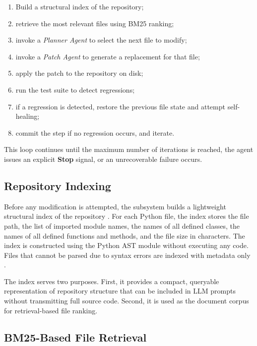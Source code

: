 \begin{enumerate}[nosep]
    \item Build a structural index of the repository;
    \item retrieve the most relevant files using BM25 ranking;
    \item invoke a \textit{Planner Agent} to select the next file to modify;
    \item invoke a \textit{Patch Agent} to generate a replacement for that file;
    \item apply the patch to the repository on disk;
    \item run the test suite to detect regressions;
    \item if a regression is detected, restore the previous file state and attempt self-healing;
    \item commit the step if no regression occurs, and iterate.
\end{enumerate}

This loop continues until the maximum number of iterations is reached, the agent issues an explicit \textbf{Stop} signal, or an unrecoverable failure occurs.

\subsection{Repository Indexing}
\label{subsec:impl_indexing}

Before any modification is attempted, the subsystem builds a lightweight structural index of the repository \cite{zhang2023repocoder}. For each Python file, the index stores the file path, the list of imported module names, the names of all defined classes, the names of all defined functions and methods, and the file size in characters. The index is constructed using the Python AST module without executing any code. Files that cannot be parsed due to syntax errors are indexed with metadata only \cite{zhang2023repocoder}.

The index serves two purposes. First, it provides a compact, queryable representation of repository structure that can be included in LLM prompts without transmitting full source code. Second, it is used as the document corpus for retrieval-based file ranking.

\subsection{BM25-Based File Retrieval}
\label{subsec:impl_retrieval}

